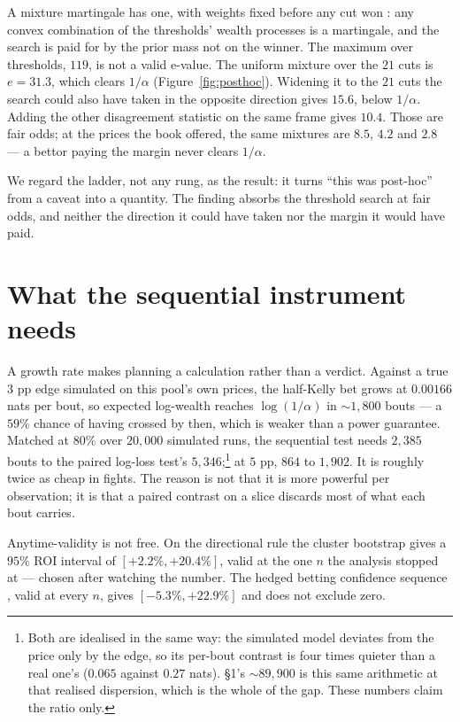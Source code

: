 \documentclass{article}
\begin{document}
A mixture martingale has one, with weights fixed before any cut won \citep{robbins1970,howard2021}: any convex combination of the thresholds' wealth processes is a martingale, and the search is paid for by the prior mass not on the winner. The maximum over thresholds, $119$, is not a valid e-value. The uniform mixture over the $21$ cuts is $e=31.3$, which clears $1/\alpha$ (Figure~\ref{fig:posthoc}). Widening it to the $21$ cuts the search could also have taken in the opposite direction gives $15.6$, below $1/\alpha$. Adding the other disagreement statistic on the same frame gives $10.4$. Those are fair odds; at the prices the book offered, the same mixtures are $8.5$, $4.2$ and $2.8$ --- a bettor paying the margin never clears $1/\alpha$.

We regard the ladder, not any rung, as the result: it turns ``this was post-hoc'' from a caveat into a quantity. The finding absorbs the threshold search at fair odds, and neither the direction it could have taken nor the margin it would have paid.

\section{What the sequential instrument needs}
\label{sec:planning}

A growth rate makes planning a calculation rather than a verdict. Against a true $3$ pp edge simulated on this pool's own prices, the half-Kelly bet grows at $0.00166$ nats per bout, so expected log-wealth reaches $\log(1/\alpha)$ in ${\sim}1{,}800$ bouts --- a $59\%$ chance of having crossed by then, which is weaker than a power guarantee. Matched at $80\%$ over $20{,}000$ simulated runs, the sequential test needs $2{,}385$ bouts to the paired log-loss test's $5{,}346$;\footnote{Both are idealised in the same way: the simulated model deviates from the price only by the edge, so its per-bout contrast is four times quieter than a real one's ($0.065$ against $0.27$ nats). \S1's ${\sim}89{,}900$ is this same arithmetic at that realised dispersion, which is the whole of the gap. These numbers claim the ratio only.} at $5$ pp, $864$ to $1{,}902$. It is roughly twice as cheap in fights. The reason is not that it is more powerful per observation; it is that a paired contrast on a slice discards most of what each bout carries.

Anytime-validity is not free. On the directional rule the cluster bootstrap gives a $95\%$ ROI interval of $[+2.2\%, +20.4\%]$, valid at the one $n$ the analysis stopped at --- chosen after watching the number. The hedged betting confidence sequence \citep{wsr2024}, valid at every $n$, gives $[-5.3\%, +22.9\%]$ and does not exclude zero.
\end{document}
